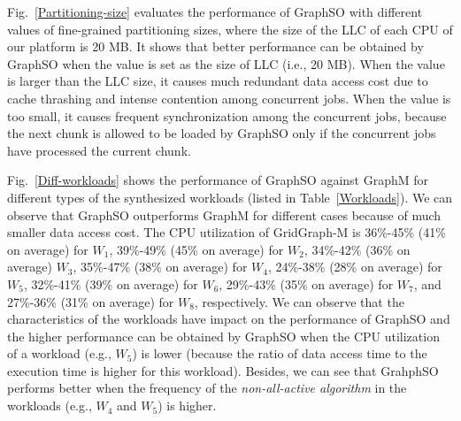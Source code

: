 \documentclass[10pt,journal,compsoc]{IEEEtran}
\begin{document}
Fig.~\ref{Partitioning-size} evaluates the performance of GraphSO with different values of fine-grained partitioning sizes, where the size of the LLC of each CPU of our platform is 20 MB. It shows that better performance can be obtained by GraphSO when the value is set as the size of LLC (i.e., 20 MB). When the value is larger than the LLC size, it causes much redundant data access cost due to cache thrashing and intense contention among concurrent jobs. When the value is too small, it causes frequent synchronization among the concurrent jobs, because the next chunk is allowed to be loaded by GraphSO only if the concurrent jobs have processed the current chunk.

Fig.~\ref{Diff-workloads} shows the performance of GraphSO against GraphM for different types of the synthesized workloads (listed in Table~\ref{Workloads}). We can observe that GraphSO outperforms GraphM for different cases because of much smaller data access cost.
The CPU utilization of GridGraph-M is 36\%-45\% (41\% on average) for $W_1$, 39\%-49\% (45\% on average) for $W_2$, 34\%-42\% (36\% on average) $W_3$, 35\%-47\% (38\% on average) for $W_4$, 24\%-38\% (28\% on average) for $W_5$, 32\%-41\% (39\% on average) for $W_6$, 29\%-43\% (35\% on average) for $W_7$, and 27\%-36\% (31\% on average) for $W_8$, respectively.
We can observe that the characteristics of the workloads have impact on the performance of GraphSO and the higher performance can be obtained by GraphSO when the CPU utilization of a workload (e.g., $W_5$) is lower (because the ratio of data access time to the execution time is higher for this workload). Besides, we can see that GrahphSO performs better when the frequency of the \textit{non-all-active algorithm} in the workloads (e.g., $W_4$ and $W_5$) is higher.


\vspace{-10pt}
\end{document}
